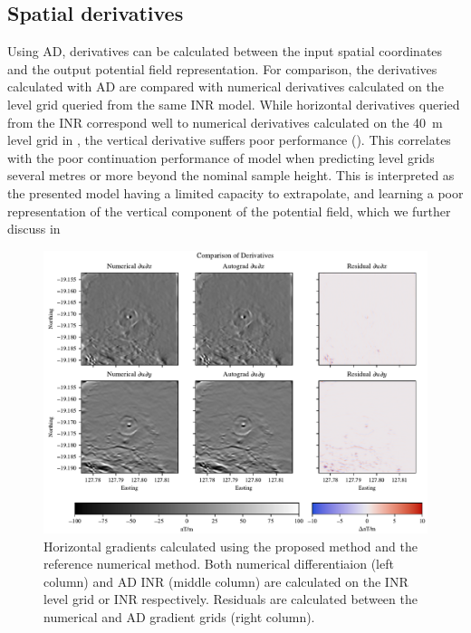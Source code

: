 \documentclass[manuscript.tex]{subfiles}
\begin{document}



\subsection{Spatial derivatives}
Using AD, derivatives can be calculated between the input spatial coordinates and the output potential field representation.
For comparison, the derivatives calculated with AD are compared with numerical derivatives calculated on the level grid queried from the same INR model.
While horizontal derivatives queried from the INR correspond well to numerical derivatives calculated on the \qty{40}{\m} level grid in , the vertical derivative suffers poor performance ().
This correlates with the poor continuation performance of model when predicting level grids several metres or more beyond the nominal sample height.
This is interpreted as the presented model having a limited capacity to extrapolate, and learning a poor representation of the vertical component of the potential field, which we further discuss in 

\begin{figure}[hbt]
    \centering{}
    \includegraphics[width=1.0\linewidth]{fig/p3/P864_dh_comparison.pdf}
    \caption[Horizontal derivatives]{Horizontal gradients calculated using the proposed method and the reference numerical method.
        Both numerical differentiaion (left column) and AD INR (middle column) are calculated on the INR level grid or INR respectively.
        Residuals are calculated between the numerical and AD gradient grids (right column).}
    \label{fig:hori_grad}
\end{figure}
\end{document}
